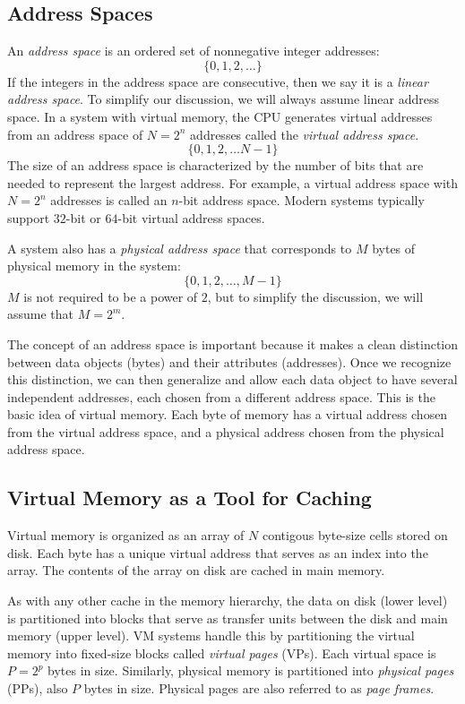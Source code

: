 \documentclass[12pt]{article}
\begin{document}
\subsection{Address Spaces}

An \textit{address space} is an ordered set of nonnegative integer addresses:
\[ \{0,1,2,\ldots\} \]
If the integers in the address space are consecutive, then we say it is a \textit{linear address space}. To simplify our discussion, we will always assume linear address space. In a system with virtual memory, the CPU generates virtual addresses from an address space of $N=2^n$ addresses called the \textit{virtual address space}.
\[ \{0,1,2,\ldots N-1\} \]
The size of an address space is characterized by the number of bits that are needed to represent the largest address. For example, a virtual address space with $N=2^n$ addresses is called an $n$-bit address space. Modern systems typically support $32$-bit or $64$-bit virtual address spaces.

A system also has a \textit{physical address space} that corresponds to $M$ bytes of physical memory in the system:
\[ \{0,1,2,\ldots,M-1\} \]
$M$ is not required to be a power of $2$, but to simplify the discussion, we will assume that $M=2^m$.

The concept of an address space is important because it makes a clean distinction between data objects (bytes) and their attributes (addresses). Once we recognize this distinction, we can then generalize and allow each data object to have several independent addresses, each chosen from a different address space. This is the basic idea of virtual memory. Each byte of memory has a virtual address chosen from the virtual address space, and a physical address chosen from the physical address space.

\subsection{Virtual Memory as a Tool for Caching}

Virtual memory is organized as an array of $N$ contigous byte-size cells stored on disk. Each byte has a unique virtual address that serves as an index into the array. The contents of the array on disk are cached in main memory. 

As with any other cache in the memory hierarchy, the data on disk (lower level) is partitioned into blocks that serve as transfer units between the disk and main memory (upper level). VM systems handle this by partitioning the virtual memory into fixed-size blocks called \textit{virtual pages} (VPs). Each virtual space is $P=2^p$ bytes in size. Similarly, physical memory is partitioned into \textit{physical pages} (PPs), also $P$ bytes in size. Physical pages are also referred to as \textit{page frames}.
\end{document}
